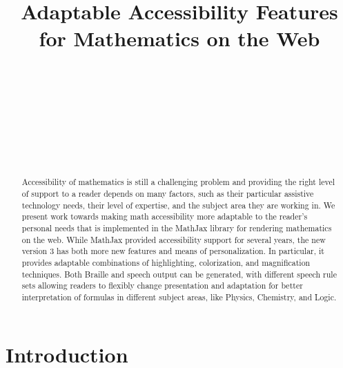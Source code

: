 \documentclass{sig-alternate}
\begin{document}

\title{Adaptable Accessibility Features for Mathematics on the Web}
  

\author{
  \\
  \\
  \\
  \\
  \\
  \\
  \\
}

\maketitle

\begin{abstract}
  Accessibility of mathematics is still a challenging problem and providing the
  right level of support to a reader depends on many factors, such as their
  particular assistive technology needs, their level of expertise, and the
  subject area they are working in. We present work towards making math
  accessibility more adaptable to the reader's personal needs that is
  implemented in the MathJax library for rendering mathematics on the web. While
  MathJax provided accessibility support for several years, the new version 3
  has both more new features and means of personalization. In particular, it
  provides adaptable combinations of highlighting, colorization, and
  magnification techniques. Both Braille and speech output can be generated,
  with different speech rule sets allowing readers to flexibly change
  presentation and adaptation for better interpretation of formulas in
  different subject areas, like Physics, Chemistry, and Logic.
\end{abstract}



\section{Introduction}
\end{document}
